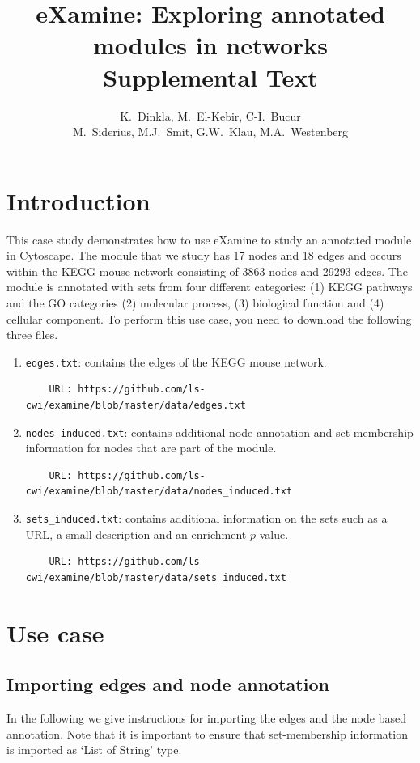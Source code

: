 \documentclass[a4paper,11pt]{article}
\title{eXamine: Exploring annotated modules in networks\\Supplemental Text}
\author{K.~Dinkla, M.~El-Kebir, C-I.~Bucur\\M.~Siderius, M.J.~Smit, G.W.~Klau,
M.A.~Westenberg}
\begin{document}
\maketitle
\tableofcontents

\section{Introduction}
This case study demonstrates how to use eXamine to study an annotated module
in Cytoscape. The module that we study has 17 nodes and 18 edges and occurs
within the KEGG mouse network consisting of 3863 nodes and 29293 edges. The
module is annotated with sets from four different categories: (1) KEGG pathways
and the GO categories (2) molecular process, (3) biological function and (4)
cellular component. To perform this use case, you need to download the following
three files. 
\begin{enumerate}
  \item \texttt{edges.txt}: contains the edges of the KEGG mouse network.
    \begin{verbatim}
    URL: https://github.com/ls-cwi/examine/blob/master/data/edges.txt
    \end{verbatim}
  \item \texttt{nodes\_induced.txt}: contains additional node annotation and
    set membership information for nodes that are part of the module.
    \begin{verbatim}
    URL: https://github.com/ls-cwi/examine/blob/master/data/nodes_induced.txt
    \end{verbatim}
  \item \texttt{sets\_induced.txt}: contains additional information on the sets
    such as a URL, a small description and an enrichment $p$-value.
    \begin{verbatim}
    URL: https://github.com/ls-cwi/examine/blob/master/data/sets_induced.txt
    \end{verbatim}
\end{enumerate}

\section{Use case}

\subsection{Importing edges and node annotation}

In the following we give instructions for importing the edges and the node based
annotation. Note that it is important to ensure that set-membership
information is imported as `List of String' type.
\end{document}
